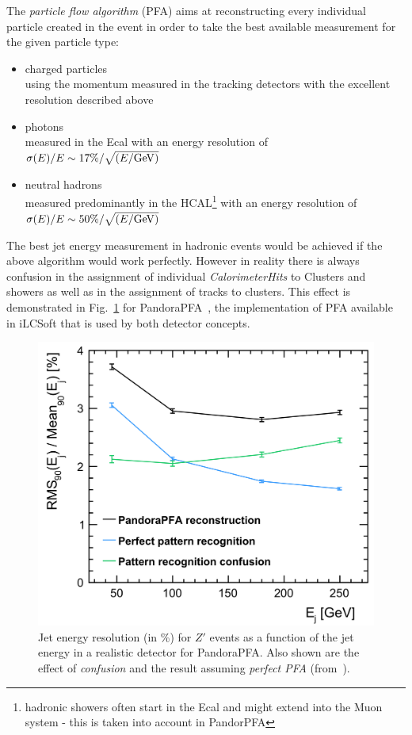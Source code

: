 The \emph{particle flow algorithm} (PFA) aims at reconstructing every individual particle created in the event in order
to take the best available measurement for the given particle type:
\begin{itemize}
\item charged particles\\
  using the momentum measured in the tracking detectors with the excellent resolution described  above
\item photons\\
  measured in the Ecal with an energy resolution of $\sigma(E)/E \sim  17\% / \sqrt{(E/\rm{GeV})}$ %
\item neutral hadrons\\
  measured predominantly in the HCAL\footnote{hadronic showers often start in the Ecal and might extend into the Muon system -
    this is taken into account in PandorPFA} with an energy resolution of $\sigma(E)/E \sim  50\% / \sqrt{(E/\rm{GeV})}$ %
\end{itemize}

The best jet energy measurement in hadronic events would be achieved if the above algorithm would work perfectly. However in reality
there is always confusion in the assignment of individual \emph{CalorimeterHits} to Clusters and showers as well as in the assignment
of tracks to clusters. This effect is demonstrated in Fig.~\ref{fig:pandorapfa_perfect} for PandoraPFA~\cite{Marshall:2015rfa}, the
implementation of PFA available in iLCSoft that is used by both detector concepts.

\begin{figure}
\begin{center}
\includegraphics[width=0.85\hsize]{chapters/figures/pandorapfa_perfect.png}
\end{center}
\caption{Jet energy resolution (in \%) for $Z'$ events as a function of the jet energy in a realistic detector for PandoraPFA.
  Also shown are the effect of \emph{confusion} and the result assuming \emph{perfect PFA} (from~\cite{Marshall:2015rfa}).} 
\label{fig:pandorapfa_perfect}
\end{figure}

